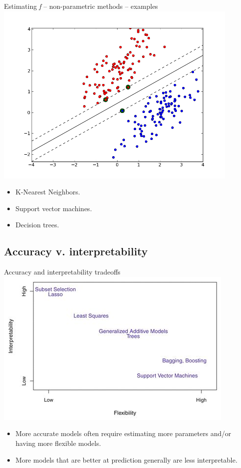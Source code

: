 \documentclass{beamer}
\begin{document}
\begin{frame}{Estimating \textit{f} -- non-parametric methods -- examples} %
\centering
\includegraphics[scale=.45]{svms}
	\begin{itemize}
		\item K-Nearest Neighbors.
		\item Support vector machines.
		\item Decision trees.
	\end{itemize}

\end{frame}

\subsection*{Accuracy v. interpretability}

\begin{frame}{Accuracy and interpretability tradeoffs} %
\centering
\includegraphics[scale=.45]{flexibility}
	\begin{itemize}
		\item More accurate models often require estimating more parameters and/or having more flexible models.
		\item More models that are better at prediction generally are less interpretable.
	\end{itemize}

\end{frame}
\end{document}
